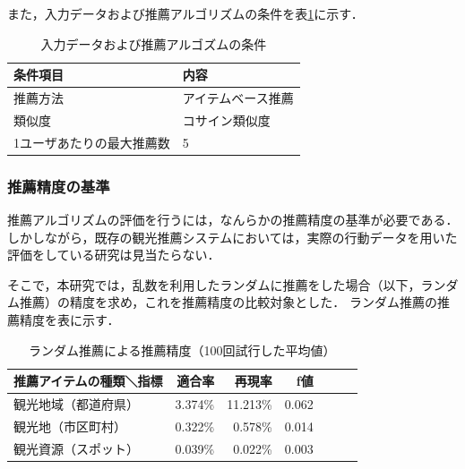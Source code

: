 \documentclass{jsarticle}
\begin{document}
また，入力データおよび推薦アルゴリズムの条件を表\ref{recommendation_condition}に示す．

\begin{table}[!h]
\small
\caption{入力データおよび推薦アルゴズムの条件}
\begin{center}
\begin{tabular}{ll}
\label{recommendation_condition}
条件項目    & 内容 \\ \hline
推薦方法    & アイテムベース推薦 \\
類似度      & コサイン類似度 \\
1ユーザあたりの最大推薦数 & 5 \\
\end{tabular}
\end{center}
\end{table}



\subsubsection{推薦精度の基準}

推薦アルゴリズムの評価を行うには，なんらかの推薦精度の基準が必要である．しかしながら，既存の観光推薦システムにおいては，実際の行動データを用いた評価をしている研究は見当たらない．

そこで，本研究では，乱数を利用したランダムに推薦をした場合（以下，ランダム推薦）の精度を求め，これを推薦精度の比較対象とした．
ランダム推薦の推薦精度を表\cite{random}に示す．

\begin{table}[!h]
\small
\caption{ランダム推薦による推薦精度（100回試行した平均値）}
\begin{center}
\begin{tabular}{lrrrrrr}
\label{result_monthly}
推薦アイテムの種類＼指標    & 適合率 & 再現率 & f値 \\ \hline
観光地域（都道府県）        & 3.374\% & 11.213\% & 0.062 \\
観光地（市区町村）          & 0.322\% &  0.578\% & 0.014 \\
観光資源（スポット）        & 0.039\% &  0.022\% & 0.003 \\
\end{tabular}
\end{center}
\end{table}
\end{document}
